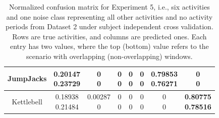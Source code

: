 \begin{table}
\begin{tabular}{|>{}c|>{}c|>{}c|>{}c|>{}c|>{}c|>{}c|>{}c|}
\hline
JumpJacks & \makecell{0.20147 \\ 0.23729} & \makecell{0 \\ 0} & \makecell{0 \\ 0} & \makecell{0 \\ 0} & \makecell{0 \\ 0} & \makecell{\textbf{0.79853} \\ \textbf{0.76271}} & \makecell{0 \\ 0}\tabularnewline
\hline
Kettlebell & \makecell{0.18938 \\ 0.21484} & \makecell{0.00287 \\ 0} & \makecell{0 \\ 0} & \makecell{0 \\ 0} & \makecell{0 \\ 0} & \makecell{0 \\ 0} & \makecell{\textbf{0.80775} \\ \textbf{0.78516}}\tabularnewline
\hline
\end{tabular}
    \caption{Normalized confusion matrix for Experiment 5, i.e., six activities and one noise class representing all other activities and no activity periods from Dataset 2 under subject independent cross validation. Rows are true activities, and columns are predicted ones. Each entry has two values, where the top (bottom) value refers to the scenario with overlapping (non-overlapping) windows.}
    \label{tab:MPR Comparison}
\end{table}

